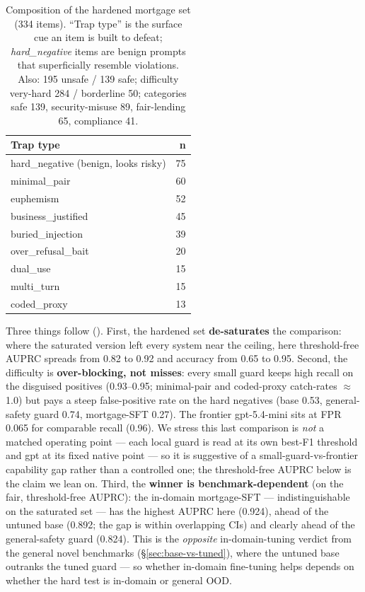 \documentclass[sigconf,nonacm]{acmart}
\begin{document}
\begin{table}[t]
\small
\centering
\caption{Composition of the hardened mortgage set (334 items). ``Trap type'' is the surface cue an item is built to defeat; \emph{hard\_negative} items are benign prompts that superficially resemble violations. Also: 195 unsafe / 139 safe; difficulty very-hard 284 / borderline 50; categories safe 139, security-misuse 89, fair-lending 65, compliance 41.}
\label{tab:hardcomp}
\begin{tabular}{lr}
\toprule
Trap type & n \\
\midrule
hard\_negative (benign, looks risky) & 75 \\
minimal\_pair & 60 \\
euphemism & 52 \\
business\_justified & 45 \\
buried\_injection & 39 \\
over\_refusal\_bait & 20 \\
dual\_use & 15 \\
multi\_turn & 15 \\
coded\_proxy & 13 \\
\bottomrule
\end{tabular}
\end{table}

Three things follow (). First, the hardened set \textbf{de-saturates} the comparison: where the saturated version left every system near the ceiling, here threshold-free AUPRC spreads from 0.82 to 0.92 and accuracy from 0.65 to 0.95. Second, the difficulty is \textbf{over-blocking, not misses}: every small guard keeps high recall on the disguised positives (0.93--0.95; minimal-pair and coded-proxy catch-rates $\approx$1.0) but pays a steep false-positive rate on the hard negatives (base 0.53, general-safety guard 0.74, mortgage-SFT 0.27). The frontier gpt-5.4-mini sits at FPR 0.065 for comparable recall (0.96). We stress this last comparison is \emph{not} a matched operating point --- each local guard is read at its own best-F1 threshold and gpt at its fixed native point --- so it is suggestive of a small-guard-vs-frontier capability gap rather than a controlled one; the threshold-free AUPRC below is the claim we lean on. Third, the \textbf{winner is benchmark-dependent} (on the fair, threshold-free AUPRC): the in-domain mortgage-SFT --- indistinguishable on the saturated set --- has the highest AUPRC here (0.924), ahead of the untuned base (0.892; the gap is within overlapping CIs) and clearly ahead of the general-safety guard (0.824). This is the \emph{opposite} in-domain-tuning verdict from the general novel benchmarks (\S\ref{sec:base-vs-tuned}), where the untuned base outranks the tuned guard --- so whether in-domain fine-tuning helps depends on whether the hard test is in-domain or general OOD.
\end{document}
